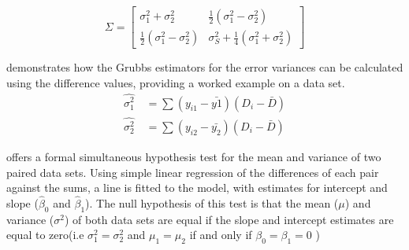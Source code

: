 \documentclass[12pt, a4paper]{report}
\theoremstyle{plain}
\theoremstyle{definition}
\theoremstyle{remark}
\begin{document}
		\begin{equation}
			\Sigma = \left[\begin{matrix}
				\sigma^{2}_{1}+\sigma^{2}_{2}&\frac{1}{2}(\sigma^{2}_{1}-\sigma^{2}_{2})\\
				\frac{1}{2}(\sigma^{2}_{1}-\sigma^{2}_{2})&\sigma^{2}_{S}+
				\frac{1}{4}(\sigma^{2}_{1}+\sigma^{2}_{2})
			\end{matrix} \right]
		\end{equation}
		
		
		
		
		
		\citet{Kinsella} demonstrates how the Grubbs estimators for the
		error variances can be calculated using the difference values,
		providing a worked example on a data set.
		\begin{eqnarray}
			\hat{\sigma^{2}_{1}}
			\quad=\sum{(y_{i1}-\bar{y{1}})(D_{i}-\bar{D})}\\
			\hat{\sigma^{2}_{2}} \quad=
			\sum{(y_{i2}-\bar{y_{2}})(D_{i}-\bar{D})} \nonumber
		\end{eqnarray}
		
		
		
		\citet{BB89} offers a formal simultaneous hypothesis test for the
		mean and variance of two paired data sets. Using simple linear
		regression of the differences of each pair against the sums, a
		line is fitted to the model, with estimates for intercept and
		slope ($\hat{\beta}_{0}$ and $\hat{\beta}_{1}$). The null
		hypothesis of this test is that the mean ($\mu$) and variance
		($\sigma^{2}$) of both data sets are equal if the slope and
		intercept estimates are equal to zero(i.e $\sigma^{2}_{1} =
		\sigma^{2}_{2}$ and $\mu_{1}=\mu_{2}$ if and only if $\beta_{0}=
		\beta_{1}=0$ )
		
\end{document}
